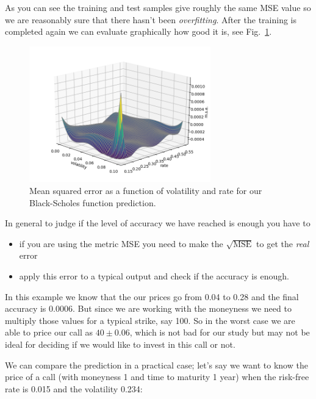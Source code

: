 As you can see the training and test samples give roughly the same MSE
value so we are reasonably sure that there hasn't been
\emph{overfitting}.
After the training is completed again we can
evaluate graphically how good it is, see Fig.~\ref{fig:vol_rate}. 

\begin{figure}[htb]
	\centering
	\includegraphics[width=0.7\textwidth]{figures/vol_rate}
	\caption{Mean squared error as a function of volatility and rate for our Black-Scholes function prediction.}
	\label{fig:vol_rate}
\end{figure}

In general to judge if the level of accuracy we have reached is enough
you have to

\begin{itemize}
	\tightlist
	\item
	if you are using the metric MSE you need to make the
	\(\sqrt{\mathrm{MSE}}\) to get the \emph{real} error
	\item
	apply this error to a typical output and check if the accuracy is
	enough.
\end{itemize}

In this example we know that the our prices go from 0.04 to 0.28 and the
final accuracy is 0.0006. But since we are working with the moneyness we
need to multiply those values for a typical strike, say 100. So in the
worst case we are able to price our call as \(40 \pm 0.06\), which
is not bad for our study but may not be ideal for deciding if we would
like to invest in this call or not.

We can compare the prediction in a practical case; let's say we
want to know the price of a call (with moneyness 1 and time to maturity
1 year) when the risk-free rate is 0.015 and the volatility 0.234:

